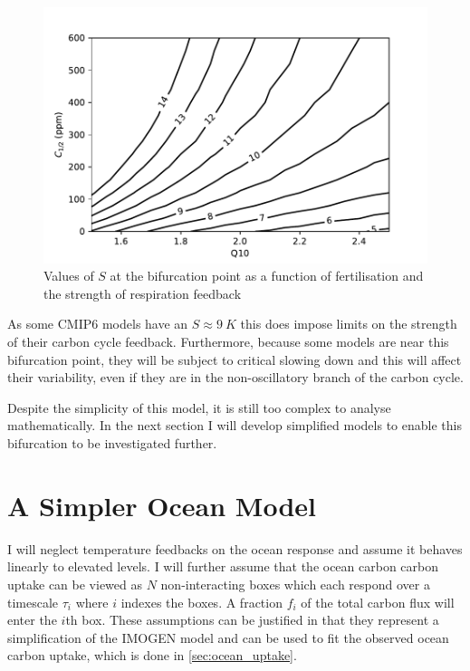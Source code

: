 \begin{figure}
  \centering
  \includegraphics[keepaspectratio,width=\textwidth]{imogen_critical_S_Q10_ca05}
  \caption{Values of $S$ at the bifurcation point as a function of  fertilisation and the strength of respiration feedback}
  \label{fig:imogen_bifurcation_plane}
\end{figure}

As some CMIP6 models have an $S \approx\SI{9}{K}$ this does impose limits on the strength of their carbon cycle feedback. Furthermore, because some models are
near this bifurcation point, they will be subject to critical slowing down and this will affect their variability, even if they are in the non-oscillatory branch of the carbon cycle.

Despite the simplicity of this model, it is still too complex to analyse mathematically. In the next section I will develop simplified models to enable this bifurcation to be investigated further.

\section{A Simpler Ocean Model}
I will neglect temperature feedbacks on the ocean response and assume it behaves linearly to elevated  levels. I will further assume that the ocean carbon carbon uptake
can be viewed as $N$ non-interacting boxes which each respond over a timescale $\tau_i$ where $i$ indexes the boxes. A fraction $f_i$ of the total carbon
flux will enter the $i$th box. These assumptions can be justified in that they represent a simplification of the IMOGEN model and can be used to fit the observed ocean carbon
uptake, which is done in \cref{sec:ocean_uptake}.

